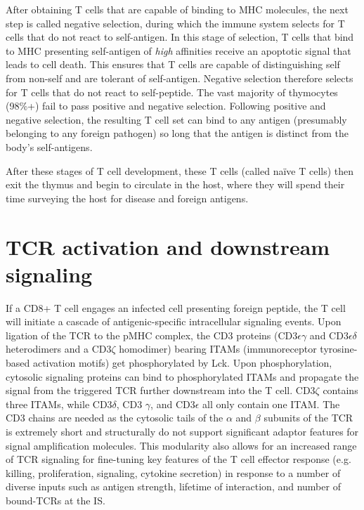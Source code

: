 After obtaining T cells that are capable of binding to MHC molecules, the next step is called negative selection, during which the immune system selects for T cells that do not react to self-antigen. In this stage of selection, T cells that bind to MHC presenting self-antigen of \textit{high} affinities receive an apoptotic signal that leads to cell death. This ensures that T cells are capable of distinguishing self from non-self and are tolerant of self-antigen. Negative selection therefore selects for T cells that do not react to self-peptide. The vast majority of thymocytes (98\%+) fail to pass positive and negative selection. Following positive and negative selection, the resulting T cell set can bind to any antigen (presumably belonging to any foreign pathogen) so long that the antigen is distinct from the body’s self-antigens. 

After these stages of T cell development, these T cells (called naïve T cells) then exit the thymus and begin to circulate in the host, where they will spend their time surveying the host for disease and foreign antigens.

\section{TCR activation and downstream signaling}
	\label{TCR activation and downstream signaling}
If a CD8+ T cell engages an infected cell presenting foreign peptide, the T cell will initiate a cascade of antigenic-specific intracellular signaling events. Upon ligation of the TCR to the pMHC complex, the CD3 proteins (CD3$\epsilon \gamma$ and CD3$\epsilon \delta$ heterodimers and a CD3$\zeta$ homodimer) bearing ITAMs (immunoreceptor tyrosine-based activation motifs) get phosphorylated by Lck. Upon phosphorylation, cytosolic signaling proteins can bind to phosphorylated ITAMs and propagate the signal from the triggered TCR further downstream into the T cell. CD3$\zeta$ contains three ITAMs, while CD3$\delta$, CD3 $\gamma$, and CD3$\epsilon$ all only contain one ITAM. The CD3 chains are needed as the cytosolic tails of the $\alpha$ and $\beta$ subunits of the TCR is extremely short and structurally do not support significant adaptor features for signal amplification molecules. This modularity also allows for an increased range of TCR signaling for fine-tuning key features of the T cell effector response (e.g. killing, proliferation, signaling, cytokine secretion) in response to a number of diverse inputs such as antigen strength, lifetime of interaction, and number of bound-TCRs at the IS.

